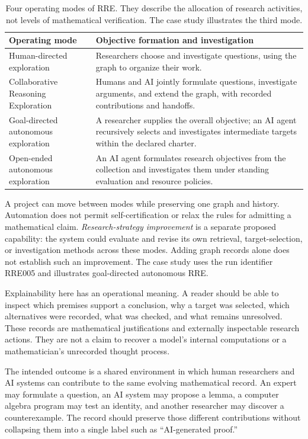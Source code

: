 \begin{table}[htbp]
\centering\small
\begin{tabularx}{\linewidth}{@{}>{\raggedright\arraybackslash}p{4.1cm}Y@{}}
\toprule
Operating mode & Objective formation and investigation \\
\midrule
Human-directed exploration & Researchers choose and investigate questions, using the graph to organize their work. \\
Collaborative Reasoning Exploration & Humans and AI jointly formulate questions, investigate arguments, and extend the graph, with recorded contributions and handoffs. \\
Goal-directed autonomous exploration & A researcher supplies the overall objective; an AI agent recursively selects and investigates intermediate targets within the declared charter. \\
Open-ended autonomous exploration & An AI agent formulates research objectives from the collection and investigates them under standing evaluation and resource policies. \\
\bottomrule
\end{tabularx}
\caption{Four operating modes of RRE. They describe the allocation of research activities, not levels of mathematical verification. The case study illustrates the third mode.}
\label{tab:operating-modes}
\end{table}

A project can move between modes while preserving one graph and history. Automation does not permit self-certification or relax the rules for admitting a mathematical claim. \emph{Research-strategy improvement} is a separate proposed capability: the system could evaluate and revise its own retrieval, target-selection, or investigation methods across these modes. Adding graph records alone does not establish such an improvement. The case study uses the run identifier RRE005 and illustrates goal-directed autonomous RRE.

Explainability here has an operational meaning. A reader should be able to inspect which premises support a conclusion, why a target was selected, which alternatives were recorded, what was checked, and what remains unresolved. These records are mathematical justifications and externally inspectable research actions. They are not a claim to recover a model's internal computations or a mathematician's unrecorded thought process.

The intended outcome is a shared environment in which human researchers and AI systems can contribute to the same evolving mathematical record. An expert may formulate a question, an AI system may propose a lemma, a computer algebra program may test an identity, and another researcher may discover a counterexample. The record should preserve those different contributions without collapsing them into a single label such as ``AI-generated proof.''

